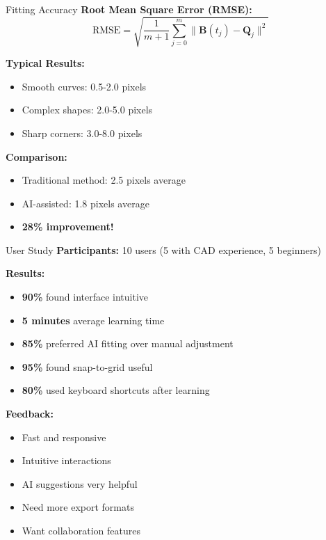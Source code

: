 \documentclass{beamer}
\begin{document}
\begin{frame}{Fitting Accuracy}
\textbf{Root Mean Square Error (RMSE):}
\begin{equation*}
\text{RMSE} = \sqrt{\frac{1}{m+1}\sum_{j=0}^{m}\|\mathbf{B}(t_j) - \mathbf{Q}_j\|^2}
\end{equation*}

\vspace{1em}

\textbf{Typical Results:}
\begin{itemize}
    \item Smooth curves: 0.5-2.0 pixels
    \item Complex shapes: 2.0-5.0 pixels
    \item Sharp corners: 3.0-8.0 pixels
\end{itemize}

\vspace{1em}

\textbf{Comparison:}
\begin{itemize}
    \item Traditional method: 2.5 pixels average
    \item AI-assisted: 1.8 pixels average
    \item \textbf{28\% improvement!}
\end{itemize}
\end{frame}

\begin{frame}{User Study}
\textbf{Participants:} 10 users (5 with CAD experience, 5 beginners)

\vspace{1em}

\textbf{Results:}
\begin{itemize}
    \item \textbf{90\%} found interface intuitive
    \item \textbf{5 minutes} average learning time
    \item \textbf{85\%} preferred AI fitting over manual adjustment
    \item \textbf{95\%} found snap-to-grid useful
    \item \textbf{80\%} used keyboard shortcuts after learning
\end{itemize}

\vspace{1em}

\textbf{Feedback:}
\begin{itemize}
    \item[$+$] Fast and responsive
    \item[$+$] Intuitive interactions
    \item[$+$] AI suggestions very helpful
    \item[$-$] Need more export formats
    \item[$-$] Want collaboration features
\end{itemize}
\end{frame}
\end{document}

